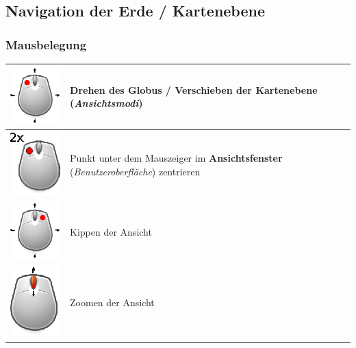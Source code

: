 \documentclass[10pt]{scrreprt}
\newcommand{\textref}[1]{\mbox{\raisebox{0.1ex}{\small$\rightarrow$ }\textit{#1}}}
\begin{document}
\newpage
\subsection{Navigation der Erde / Kartenebene} 

\vspace{3mm}
\subsubsection*{Mausbelegung}  
\begin{tabular}{|>{\centering \arraybackslash}m{3cm}|m{10cm}|}
\hline
\includegraphics[scale=1.0]{images/mouseDrag_left.eps} & \begin{flushleft}
Drehen des \textbf{Globus} / Verschieben der \textbf{Kartenebene} (\textref{Ansichtsmodi})
\end{flushleft}\\ 
\hline 
\includegraphics[scale=1.0]{images/mouseDoubleClick_left.eps} & \begin{flushleft}
Punkt unter dem Mauszeiger im \textbf{Ansichtsfenster} (\textref{Benutzeroberfläche}) zentrieren 
\end{flushleft}\\
\hline
\includegraphics[scale=1.0]{images/mouseDrag_right.eps} & Kippen der Ansicht \\
\hline
\includegraphics[scale=1.0]{images/mouse_scrollen.eps} & Zoomen der Ansicht \\
\hline
\end{tabular} 
\end{document}
